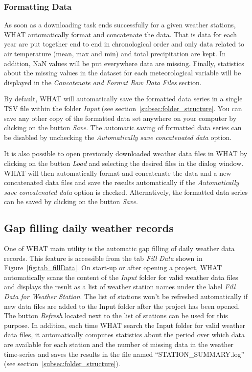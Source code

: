 \documentclass[12pt, letterpaper, fleqn]{report}
\begin{document}
\subsubsection{Formatting Data}

As soon as a downloading task ends successfully for a given weather stations, WHAT automatically format and concatenate the data. That is data for each year are put together end to end in chronological order and only data related to air temperature (mean, max and min) and total precipitation are kept. In addition, NaN values will be put everywhere data are missing. Finally, statistics about the missing values in the dataset for each meteorological variable will be displayed in the \emph{Concatenate and Format Raw Data Files} section.

By default, WHAT will automatically save the formatted data series in a single TSV file within the folder \emph{Input} (see section~\ref{subsec:folder_structure}. You can save any other copy of the formatted data set anywhere on your computer by clicking on the button \emph{Save}. The automatic saving of formatted data series can be disabled by unchecking the \emph{Automatically save concatenated data} option. 

It is also possible to open previously downloaded weather data files in WHAT by clicking on the button \emph{Load} and selecting the desired files in the dialog window. WHAT will then automatically format and concatenate the data and a new concatenated data files and save the results automatically if the \emph{Automatically save concatenated data} option is checked. Alternatively, the formatted data series can be saved by clicking on the button \emph{Save}.

\subsection{Gap filling daily weather records}

One of WHAT main utility is the automatic gap filling of daily weather data records. This feature is accessible from the tab \emph{Fill Data} shown in Figure~\ref{fig:tab_fillData}. On start-up or after opening a project, WHAT automatically scans the content of the \emph{Input} folder for valid weather data files and displays the result as a list of weather station names under the label \emph{Fill Data for Weather Station}. The list of stations won't be refreshed automatically if new data files are added to the Input folder after the project has been opened. The button \emph{Refresh} located next to the list of stations can be used for this purpose. In addition, each time WHAT search the Input folder for valid weather data files, it automatically computes statistics about the period over which data are available for each station and the number of missing data in the weather time-series and saves the results in the file named ``STATION\_SUMMARY.log'' (see section~\ref{subsec:folder_structure}).
\end{document}
